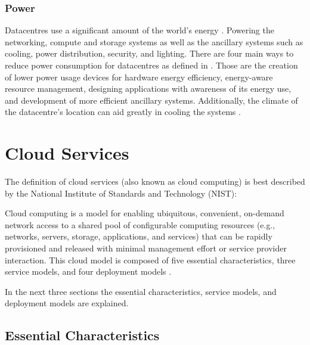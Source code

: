 \documentclass[12pt]{article}
\begin{document}

\subsubsection{Power} \label{ssub:power}

Datacentres use a significant amount of the world's energy \cite{datacentreenergy}. Powering the networking, compute and storage systems as well as the ancillary systems such as cooling, power distribution, security, and lighting. There are four main ways to reduce power consumption for datacentres as defined in \cite{Jennings2015}. Those are the creation of lower power usage devices for hardware energy efficiency, energy-aware resource management, designing applications with awareness of its energy use, and development of more efficient ancillary systems. Additionally, the climate of the datacentre's location can aid greatly in cooling the systems \cite{norwaydatacentre}.


\section{Cloud Services} \label{sec:cloud-services}

The definition of cloud services (also known as cloud computing) is best described by the National Institute of Standards and Technology (NIST):

\begin{displayquote}
Cloud computing is a model for enabling ubiquitous, convenient, on-demand network access to a shared pool of configurable computing resources (e.g., networks, servers, storage, applications, and services) that can be rapidly provisioned and released with minimal management effort or service provider interaction. This cloud model is composed of five essential characteristics, three service models, and four deployment models \cite{mell2011nist}.
\end{displayquote}

In the next three sections the essential characteristics, service models, and deployment models are explained.



\subsection{Essential Characteristics} \label{sub:essential-characteristics}
\end{document}
